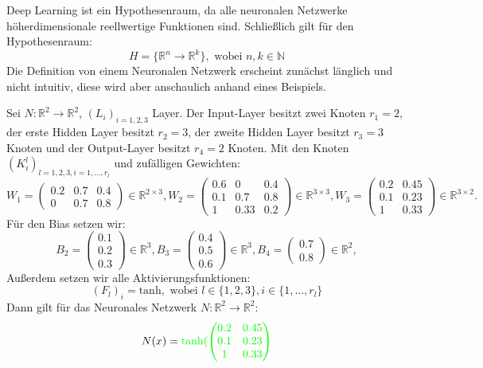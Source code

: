 \documentclass[12pt,letterpaper,ngerman]{article}
\begin{document}
Deep Learning ist ein Hypothesenraum, da alle neuronalen Netzwerke 
höherdimensionale reellwertige Funktionen sind. Schließlich gilt für den
Hypothesenraum:
\[
  H = \{\mathbb{R}^n \to \mathbb{R}^k\}, \text{ wobei } n,k \in \mathbb{N}
\]
Die Definition von einem Neuronalen Netzwerk erscheint zunächst länglich und nicht intuitiv,
diese wird aber anschaulich anhand eines Beispiels.
\begin{example}
  Sei $N: \mathbb{R}^2 \to \mathbb{R}^2$, $(L_i)_{i=1,2,3}$ Layer.
  Der Input-Layer besitzt zwei Knoten $r_1 = 2$, der erste
  Hidden Layer besitzt $r_2 = 3$, der zweite Hidden Layer besitzt
  $r_3 = 3$ Knoten und der Output-Layer besitzt $r_4 = 2$ Knoten.
  Mit den Knoten $(K^l_i)_{l=1,2,3, i = 1, \dots, r_l}$ und zufälligen
  Gewichten:
  \[
    W_1 = \begin{pmatrix} 0.2 & 0.7 & 0.4 \\  0 & 0.7 & 0.8 \end{pmatrix} 
    \in \mathbb{R}^{2 \times 3},
    W_2 = \begin{pmatrix} 0.6 & 0 & 0.4  \\ 0.1 & 0.7 & 0.8 \\ 1 & 0.33 & 0.2 \end{pmatrix}
    \in \mathbb{R}^{3 \times 3},
    W_3 = \begin{pmatrix} 0.2 & 0.45 \\ 0.1 & 0.23 \\ 1 & 0.33 \end{pmatrix}
    \in \mathbb{R}^{3 \times 2}.
  \]
  Für den Bias setzen wir:
  \[
    B_2 = \begin{pmatrix} 0.1  \\ 0.2 \\ 0.3\end{pmatrix} \in \mathbb{R}^3,
    B_3 = \begin{pmatrix} 0.4  \\ 0.5 \\ 0.6\end{pmatrix} \in \mathbb{R}^3,
    B_4 = \begin{pmatrix} 0.7  \\ 0.8 \end{pmatrix} \in \mathbb{R}^2,
  \]
  Außerdem setzen wir alle Aktivierungsfunktionen:
  \[
    (F_{l})_i = \text{tanh}, \text{ wobei } l \in \{ 1, 2, 3\},
      i \in \{1, \dots, r_l\}
  \]
  Dann gilt für das Neuronales Netzwerk $N: \mathbb{R}^2 \to \mathbb{R}^2$:
  \[
    N(x) = 
    {\color{green}
    \text{tanh}(\begin{pmatrix} 0.2 & 0.45 \\ 0.1 & 0.23 \\ 1 & 0.33 \end{pmatrix}
}\]
\end{example}
\end{document}
